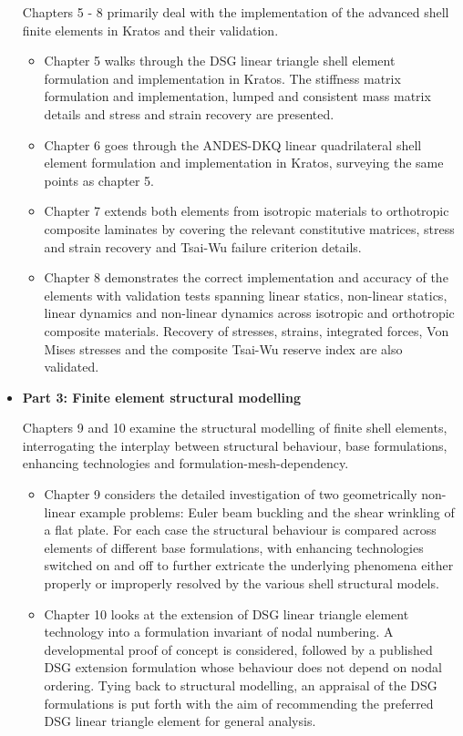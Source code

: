 \begin{itemize}
	Chapters 5 - 8 primarily deal with the implementation of the advanced shell finite elements in Kratos and their validation.
	\begin{itemize}
		\item Chapter 5 walks through the DSG linear triangle shell element formulation and implementation in Kratos. The stiffness matrix formulation and implementation, lumped and consistent mass matrix details and stress and strain recovery are presented.
		\item Chapter 6 goes through the ANDES-DKQ linear quadrilateral shell element formulation and implementation in Kratos, surveying the same points as chapter 5.
		\item Chapter 7 extends both elements from isotropic materials to orthotropic composite laminates by covering the relevant constitutive matrices, stress and strain recovery and Tsai-Wu failure criterion details.
		\item Chapter 8 demonstrates the correct implementation and accuracy of the elements with validation tests spanning linear statics, non-linear statics, linear dynamics and non-linear dynamics across isotropic and orthotropic composite materials. Recovery of stresses, strains, integrated forces, Von Mises stresses and the composite Tsai-Wu reserve index are also validated.
	\end{itemize}
	\newpage
	\item \textbf{Part 3: Finite element structural modelling}
	
	Chapters 9 and 10 examine the structural modelling of finite shell elements, interrogating the interplay between structural behaviour, base formulations, enhancing technologies and formulation-mesh-dependency.
	\begin{itemize}
		\item Chapter 9 considers the detailed investigation of two geometrically non-linear example problems: Euler beam buckling and the shear wrinkling of a flat plate. For each case the structural behaviour is compared across elements of different base formulations, with enhancing technologies switched on and off to further extricate the underlying phenomena either properly or improperly resolved by the various shell structural models.
		\item Chapter 10 looks at the extension of DSG linear triangle element technology into a formulation invariant of nodal numbering. A developmental proof of concept is considered, followed by a published DSG extension formulation whose behaviour does not depend on nodal ordering. Tying back to structural modelling, an appraisal of the DSG formulations is put forth with the aim of recommending the preferred DSG linear triangle element for general analysis.
	\end{itemize}
\end{itemize}


